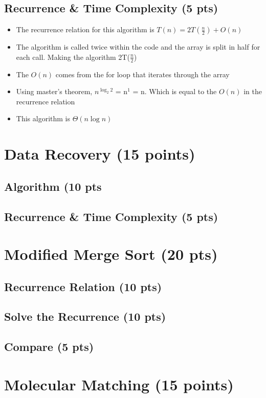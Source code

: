 \documentclass{article}[12pt]
\begin{document}
\vspace*{10px}
\subsection{Recurrence \& Time Complexity (5 pts)}
\begin{itemize}
  \item The recurrence relation for this algorithm is $T(n) = 2T(\frac{n}{2}) + O(n)$
  \item The algorithm is called twice within the code and the 
    array is split in half for each call. Making the algorithm 
    2T($\frac{n}{2}$)
  \item The $O(n)$ comes from the for loop that iterates through the array
  \item Using master's theorem,
    $n^{\log_{2} 2}$ = n$^{1}$ = n.
    Which is equal to the $O(n)$ in the recurrence relation
  \item This algorithm is $\Theta(n \log n)$
\end{itemize}

\newpage
\section{Data Recovery (15 points)}
\subsection{Algorithm (10 pts}

\vspace*{10px}
\subsection{Recurrence \& Time Complexity (5 pts)}

\newpage
\section{Modified Merge Sort (20 pts)}

\vspace*{10px}
\subsection{Recurrence Relation (10 pts)}

\vspace*{10px}
\subsection{Solve the Recurrence (10 pts)}

\vspace*{10px}
\subsection{Compare (5 pts)}

\newpage
\section{Molecular Matching (15 points)}
\end{document}
